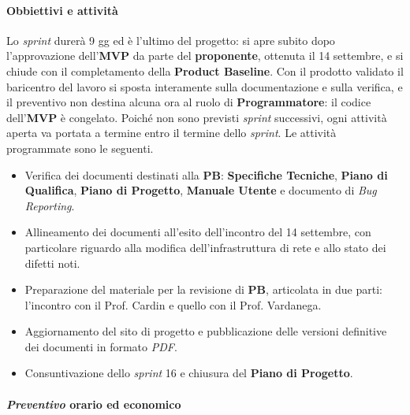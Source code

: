 \documentclass[12pt, a4paper]{article}
\begin{document}
{\paragraph{Obbiettivi e attività} Lo \textit{sprint} durerà 9 gg ed è l'ultimo del progetto: si apre subito dopo l'approvazione dell'\textbf{MVP} da parte del \textbf{proponente}, ottenuta il 14 settembre, e si chiude con il completamento della \textbf{Product Baseline}. Con il prodotto validato il baricentro del lavoro si sposta interamente sulla documentazione e sulla verifica, e il preventivo non destina alcuna ora al ruolo di \textbf{Programmatore}: il codice dell'\textbf{MVP} è congelato. Poiché non sono previsti \textit{sprint} successivi, ogni attività aperta va portata a termine entro il termine dello \textit{sprint}. Le attività programmate sono le seguenti.
\begin{itemize}
    \item Verifica dei documenti destinati alla \textbf{PB}: \textbf{Specifiche Tecniche}, \textbf{Piano di Qualifica}, \textbf{Piano di Progetto}, \textbf{Manuale Utente} e documento di \textit{Bug Reporting}.
    \item Allineamento dei documenti all'esito dell'incontro del 14 settembre, con particolare riguardo alla modifica dell'infrastruttura di rete e allo stato dei difetti noti.
    \item Preparazione del materiale per la revisione di \textbf{PB}, articolata in due parti: l'incontro con il Prof. Cardin e quello con il Prof. Vardanega.
    \item Aggiornamento del sito di progetto e pubblicazione delle versioni definitive dei documenti in formato \textit{PDF}.
    \item Consuntivazione dello \textit{sprint} 16 e chiusura del \textbf{Piano di Progetto}.
\end{itemize}

\paragraph{\textit{Preventivo} orario ed economico}

}
\end{document}
